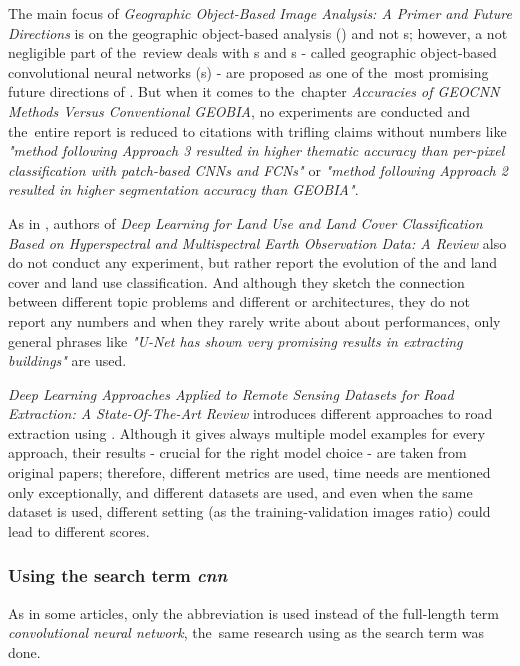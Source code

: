 The main focus of \textit{Geographic Object-Based Image Analysis: A Primer and Future Directions} is on the geographic object-based analysis () and not s; however, a not negligible part of the~review deals with s and s - called geographic object-based convolutional neural networks (s) - are proposed as one of the~most promising future directions of . But when it comes to the~chapter \textit{Accuracies of GEOCNN Methods Versus Conventional GEOBIA}, no experiments are conducted and the~entire report is reduced to citations with trifling claims without numbers like \textit{"method following Approach 3 resulted in higher thematic accuracy than per-pixel classification with patch-based CNNs and FCNs"} or \textit{"method following Approach 2 resulted in higher segmentation accuracy than GEOBIA"}.

As in \cite{review-dl-eo}, authors of \textit{Deep Learning for Land Use and Land Cover Classification Based on Hyperspectral and Multispectral Earth Observation Data: A Review} also do not conduct any experiment, but rather report the evolution of the  and land cover and land use classification. And although they sketch the connection between different topic problems and different  or  architectures, they do not report any numbers and when they rarely write about about performances, only general phrases like \textit{"U-Net has shown very promising results in extracting buildings"} are used.

\textit{Deep Learning Approaches Applied to Remote Sensing Datasets for Road Extraction: A State-Of-The-Art Review} introduces different approaches to road extraction using . Although it gives always multiple model examples for every approach, their results - crucial for the right model choice - are taken from original papers; therefore, different metrics are used, time needs are mentioned only exceptionally, and different datasets are used, and even when the same dataset is used, different setting (as the training-validation images ratio) could lead to different scores.

\subsubsection{Using the search term \textit{cnn}}
\label{wos-reviews-cnn}

As in some articles, only the abbreviation \textit{} is used instead of the full-length term \textit{convolutional neural network}, the~same research using \textit{} as the search term was done.

